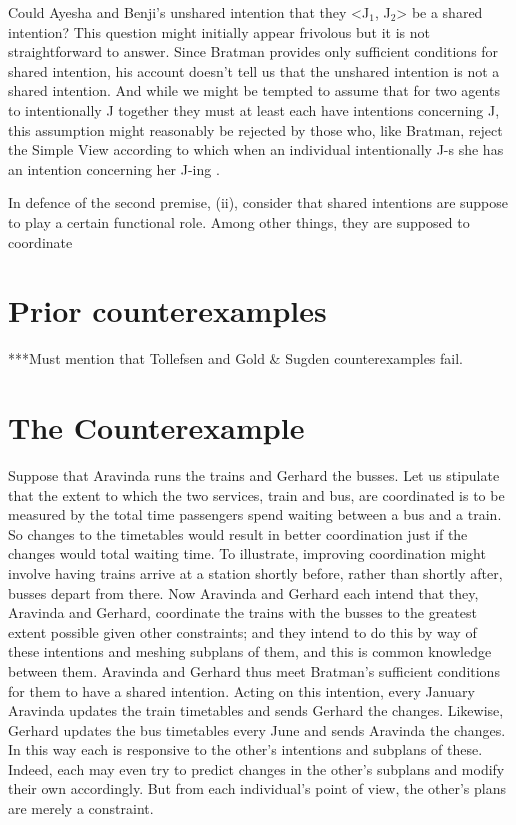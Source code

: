 \documentclass[12pt,\papersize]{extarticle}
\begin{document}
Could Ayesha and Benji's unshared intention that they <J$_1$, J$_2$> be a  shared intention?
This question might initially appear frivolous but it is not straightforward to answer.
Since Bratman provides only sufficient conditions for shared intention, his account doesn't tell us that the unshared intention is not a shared intention.
And while we might be tempted to assume that for two agents to intentionally J together they must at least each have intentions concerning J, 
this assumption might reasonably be rejected by those who, like Bratman, reject the Simple View according to which when an individual intentionally J-s she has an intention concerning her J-ing \citep{Bratman:1984jr}.

In defence of the second premise, (ii), consider that shared intentions are suppose to play a certain functional role.
Among other things, they are supposed to coordinate 







\section{Prior counterexamples}
***Must mention that Tollefsen and Gold \& Sugden counterexamples fail.


\section{The Counterexample}
Suppose that Aravinda runs the trains and Gerhard  the busses.
Let us stipulate that the extent to which the two services, train and bus, are coordinated is to be measured by the total time passengers spend waiting between a bus and a train.
So changes to the timetables would result in better coordination just if the changes would total waiting time.
To illustrate, improving coordination might involve having trains arrive at a station shortly before, rather than shortly after, busses depart from there.
Now Aravinda and Gerhard each intend that they, Aravinda and Gerhard, coordinate the trains with the busses to the greatest extent possible given other constraints; and they intend to do this by way of these intentions and meshing subplans of them, and this is common knowledge between them. 
Aravinda and Gerhard thus meet Bratman's sufficient conditions for them to have a shared intention.
Acting on this intention, 
every January Aravinda updates the train timetables and sends Gerhard the changes.
Likewise, Gerhard  updates the bus timetables every June and sends Aravinda the changes.
In this way  each is responsive to the other's intentions and subplans of these. 
Indeed, each may even try to predict changes in the other's subplans and modify their own accordingly.  
But from each individual's point of view, the other's plans are  merely a constraint.
\end{document}
